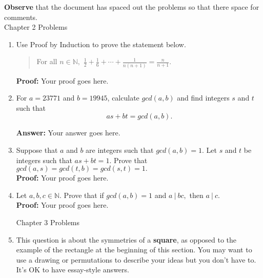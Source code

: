 \documentclass[12pt]{article}
\renewcommand{\emph}[1]{\textsf{\textbf{#1}}}
\newcommand{\bbN}{\mathbb{N}}
\begin{document}
\textbf{Observe} that the document has spaced out the problems so that there space for comments.\\

Chapter 2 Problems\\

\begin{enumerate}
\item Use Proof by Induction to prove the statement below.\\

\begin{quote} For all $n \in \bbN,$ $\displaystyle \frac{1}{2}+\frac{1}{6}+ \cdots + \frac{1}{n(n+1)}=\frac{n}{n+1}.$ \end{quote}

\textbf{Proof:} Your proof goes here.

\newpage

\item For $a=23771$ and $b=19945$, calculate $gcd(a,b)$ and find integers $s$ and $t$ such that 
$$as+bt=gcd(a,b).$$

\textbf{Answer:} Your answer goes here.

\newpage

\item Suppose that $a$ and $b$ are integers such that $gcd(a,b)=1.$ Let $s$ and $t$ be integers such that $as+bt=1.$ Prove that $gcd(a,s)=gcd(t,b)=gcd(s,t)=1.$\\

\textbf{Proof:} Your proof goes here.

\newpage

\item Let $a,b,c \in \bbN.$ Prove that if $gcd(a,b)=1$ and $a \: | \: bc,$ then $a \: | \: c.$\\

\textbf{Proof:} Your proof goes here.

\newpage

Chapter 3 Problems

\item This question is about the symmetries of a \emph{square}, as opposed to the example of the rectangle at the beginning of this section. You may want to use a drawing or permutations to describe your ideas but you don't have to. It's OK to have essay-style answers.\\



\end{enumerate}
\end{document}
